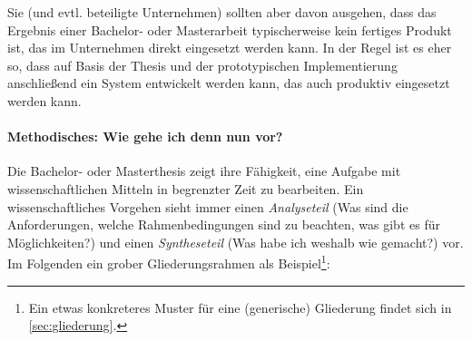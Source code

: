 \documentclass[11pt]{scrartcl}
\newcommand{\qto}[1]{\glqq #1\grqq}				%
\newcommand{\evtl}{evtl.\xspace}
\begin{document}
Sie (und \evtl beteiligte Unternehmen) sollten aber davon ausgehen, dass das Ergebnis einer Bachelor- oder Masterarbeit typischerweise kein fertiges Produkt ist, das im Unternehmen direkt eingesetzt werden kann. In der Regel ist es eher so, dass auf Basis der Thesis und der prototypischen Implementierung anschließend ein System entwickelt werden kann, das auch produktiv eingesetzt werden kann.

\paragraph{Methodisches: Wie gehe ich denn nun vor?} Die Bachelor- oder Masterthesis zeigt ihre Fähigkeit, eine Aufgabe mit wissenschaftlichen Mitteln in begrenzter Zeit zu bearbeiten. Ein wissenschaftliches Vorgehen sieht immer einen \textit{Analyseteil} (\qto{Was sind die Anforderungen, welche Rahmenbedingungen sind zu beachten, was gibt es für Möglichkeiten?}) und einen \textit{Syntheseteil} (\qto{Was habe ich weshalb wie gemacht?}) vor. Im Folgenden ein grober Gliederungsrahmen als Beispiel\footnote{Ein etwas konkreteres Muster für eine (generische) Gliederung findet sich in \cref{sec:gliederung}.}:
\end{document}
